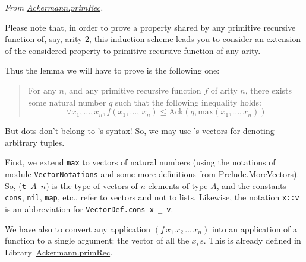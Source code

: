 \vspace{4pt}
\noindent
\emph{From \href{../theories/html/hydras.Ackermann.primRec.html}{Ackermann.primRec}.}






Please note that, in order to prove a property shared by any primitive recursive function of, say, arity 2, this induction scheme  leads you to consider an extension of the considered property to primitive recursive function of any arity.

Thus the lemma we will have to prove is the following one:


  \begin{quote}
    For any $n$, and any primitive recursive function $f$ of  arity $n$, there exists some natural number $q$ such that the following inequality holds:
 \[
  \forall x_1,\dots,x_n, 
      f(x_1,\dots,\,x_n)\leq\textrm{Ack}(q,\textrm{max}(x_1,\dots,x_n))
\]
 \end{quote}


But dots don't belong to \gallina's syntax! So, we may use \coq's vectors for denoting arbitrary tuples.

First, we extend \texttt{max} to vectors of natural numbers (using the notations of module \texttt{VectorNotations} and some more definitions from 
\href{../theories/html/hydras.Prelude.MoreVectors.html}{Prelude.MoreVectors}). So, (\texttt{t\,$A$\,$n$}) is the type of vectors of $n$ elements of type $A$, and the constants \texttt{cons}, \texttt{nil}, \texttt{map}, etc., refer to vectors and not to lists. Likewise, the notation \texttt{x::v} is an abbreviation for
\texttt{VectorDef.cons x \_ v}.











We have also to convert any application
$(f\,x_1\,x_2\,\dots\,x_n)$ into an application of a function 
to a single argument: the vector of all the $x_i$\,s.
This is already defined in 
Library~\href{../theories/html/hydras.Ackermann.primRec.html}{Ackermann.primRec}.


